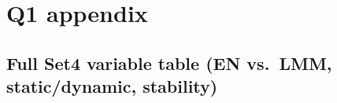 %

\section{Q1 appendix}
\label{app:results-q1}

\subsection{Full Set4 variable table (EN vs.\ LMM, static/dynamic, stability)}
\label{app:nonlinearity-check}


